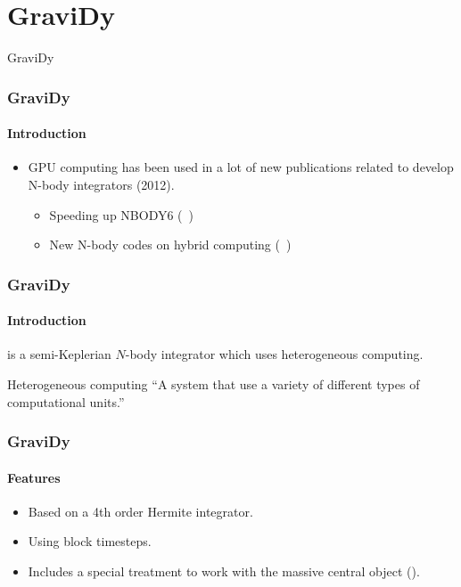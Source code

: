 \section{GraviDy}

\begin{frame}
    \begin{center}
        {\Huge GraviDy}
    \end{center}
\end{frame}

\begin{frame}
    \frametitle{GraviDy}
    \framesubtitle{Introduction}
    \begin{itemize}
        \item GPU computing has been used
            in a lot of new publications related to develop N-body integrators (2012).
        \begin{itemize}
            \item Speeding up NBODY6 (~\cite{2012MNRAS.424..545N})
            \item New N-body codes on hybrid computing (~\cite{2012arXiv1207.2367C})
        \end{itemize}
    \end{itemize}
\end{frame}


\begin{frame}
    \frametitle{GraviDy}
    \framesubtitle{Introduction}
    \begin{center}
         is a semi-Keplerian $N$-body integrator which uses
        heterogeneous computing.
    \end{center}
    \begin{block}{Heterogeneous computing}
        ``A system that use a variety of different types of computational units.''
    \end{block}
\end{frame}

\begin{frame}
    \frametitle{GraviDy}
    \framesubtitle{Features}
    \begin{itemize}
        \item Based on a 4th order Hermite integrator.
        \item Using block timesteps.
        \item Includes a special treatment to work with the massive central object ().
    \end{itemize}
\end{frame}

